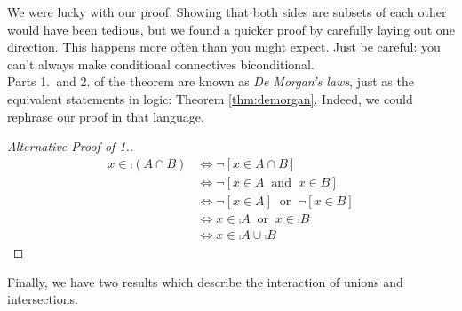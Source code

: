 \noindent We were lucky with our proof. Showing that both sides are subsets of each other would have been tedious, but we found a quicker proof by carefully laying out one direction. This happens more often than you might expect. Just be careful: you can't always make conditional connectives biconditional.\\

\noindent Parts 1.\ and 2. of the theorem are known as \emph{De Morgan's laws}, just as the equivalent statements in logic: Theorem \ref{thm:demorgan}. Indeed, we could rephrase our proof in that language.

\begin{proof}[Alternative Proof of 1.]
\begin{align*}
x\in\comp{(A\cap B)}&\iff \neg[x\in A\cap B]\\
&\iff \neg[x\in A\ \text{ and }\  x\in B]\\
&\iff \neg[x\in A]\ \text{ or }\ \neg[x\in B]\tag*{(De Morgan's first law)}\\
&\iff x\in\comp A\ \text{ or }\ x\in\comp B\\
&\iff x\in\comp A\cup\comp B\tag*{\qedhere}
\end{align*}
\end{proof}

Finally, we have two results which describe the interaction of unions and intersections.\\

